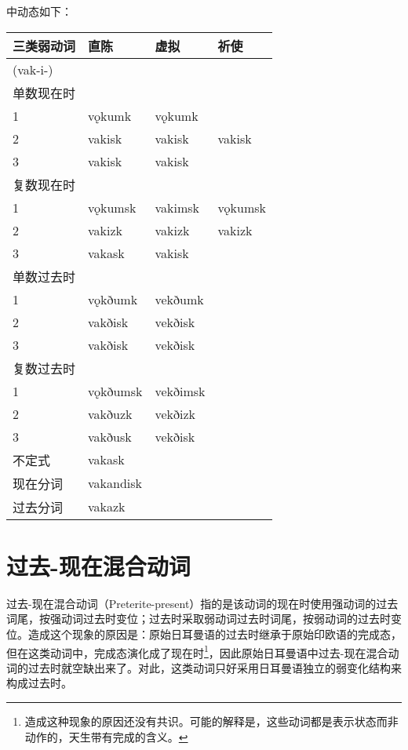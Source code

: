 中动态如下：

\begin{longtable}{llll}
  \toprule
  三类弱动词    & 直陈        & 虚拟       & 祈使      \\
  \midrule
  \endhead
  \bottomrule
  \endfoot
  (vak-i-) &           &          &         \\
  单数现在时    &           &          &         \\
  1        & vǫkumk    & vǫkumk   &         \\
  2        & vakisk    & vakisk   & vakisk  \\
  3        & vakisk    & vakisk   &         \\
  复数现在时    &           &          &         \\
  1        & vǫkumsk   & vakimsk  & vǫkumsk \\
  2        & vakizk    & vakizk   & vakizk  \\
  3        & vakask    & vakisk   &         \\
  单数过去时    &           &          &         \\
  1        & vǫkðumk   & vekðumk  &         \\
  2        & vakðisk   & vekðisk  &         \\
  3        & vakðisk   & vekðisk  &         \\
  复数过去时    &           &          &         \\
  1        & vǫkðumsk  & vekðimsk &         \\
  2        & vakðuzk   & vekðizk  &         \\
  3        & vakðusk   & vekðisk  &         \\
  不定式      & vakask    &          &         \\
  现在分词     & vakandisk &          &         \\
  过去分词     & vakazk    &          &         \\
\end{longtable}

\section{过去-现在混合动词}\label{过去-现在混合动词}

过去-现在混合动词（Preterite-present）指的是该动词的现在时使用强动词的过去词尾，按强动词过去时变位；过去时采取弱动词过去时词尾，按弱动词的过去时变位。造成这个现象的原因是：原始日耳曼语的过去时继承于原始印欧语的完成态，但在这类动词中，完成态演化成了现在时\footnote{造成这种现象的原因还没有共识。可能的解释是，这些动词都是表示状态而非动作的，天生带有完成的含义。}，因此原始日耳曼语中过去-现在混合动词的过去时就空缺出来了。对此，这类动词只好采用日耳曼语独立的弱变化结构来构成过去时。

